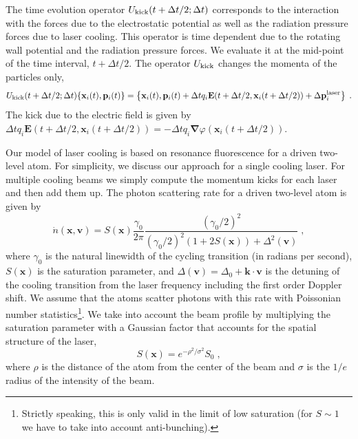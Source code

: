\documentclass[aps, pra, preprint]{revtex4-1}
\begin{document}
The time evolution operator $U_{\rm kick}(t + \Delta t/2; \Delta
t)$ corresponds to the interaction with the forces due to the
electrostatic potential as well as the radiation pressure forces
due to laser cooling. This operator is time dependent due to the
rotating wall potential and the radiation pressure forces. We
evaluate it at the mid-point of the time interval, $t + \Delta t
/ 2$. The operator $U_{\rm kick}$ changes the momenta of the
particles only,
\begin{equation}
  U_{\rm kick}(t + \Delta t /2; \Delta t)
    \{\mathbf{x}_i(t), \mathbf{p}_i(t)\} =
  \left\{
      \mathbf{x}_i(t),
      \mathbf{p}_i(t) +
      \Delta t q_i \mathbf{E}(t + \Delta t / 2, \mathbf{x}_i(t + \Delta t / 2)) +
      \Delta \mathbf{p}_i^{\rm laser}
      \right\}\;.
\end{equation}
The kick due to the electric field is given by $\Delta t
q_i\mathbf{E}(t+\Delta t /2,\mathbf{x}_i(t + \Delta t / 2)) = -\Delta t
q_i\mathbf{\nabla}\varphi(\mathbf{x}_i(t + \Delta t / 2))$.

Our model of laser cooling is based on resonance fluorescence for
a driven two-level atom. For simplicity, we discuss our approach
for a single cooling laser. For multiple cooling beams we simply
compute the momentum kicks for each laser and then add them up.
The photon scattering rate for a driven two-level atom is given
by
\begin{equation}
\dot n (\mathbf{x}, \mathbf{v}) = 
S(\mathbf{x})\frac{\gamma_0}{2\pi}
\frac{(\gamma_0/2)^2}{(\gamma_0/2)^2(1+2S(\mathbf{x}))+\Delta^2(\mathbf{v})}\;,
\end{equation}
where $\gamma_0$ is the natural linewidth of the cycling transition (in
radians per second), $S(\mathbf{x})$ is the saturation parameter, and
$\Delta(\mathbf{v})=\Delta_0 + \mathbf{k}\cdot\mathbf{v}$ is the
detuning of the cooling transition from the laser frequency including
the first order Doppler shift.  We assume that the atoms scatter photons
with this rate with Poissonian number statistics\footnote{Strictly
speaking, this is only valid in the limit of low saturation (for
$S\sim 1$ we have to take into account anti-bunching).}.  We take into
account the beam profile by multiplying the saturation parameter with a
Gaussian factor that accounts for the spatial structure of the laser,
\begin{equation}
S(\mathbf{x})=e^{-\rho^2/\sigma^2}S_0\;,
\end{equation}
where $\rho$ is the distance of the atom from the center of the beam and
$\sigma$ is the $1/e$ radius of the intensity of the beam.
\end{document}
